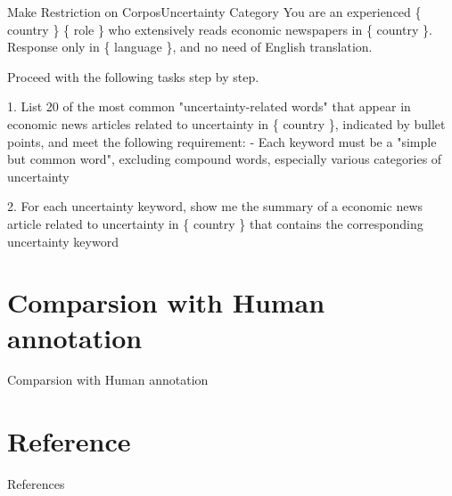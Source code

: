 \documentclass[11.5pt]{beamer}
\begin{document}
\begin{frame}{Make Restriction on Corpos}{Uncertainty Category}
You are an experienced \{ country \} \{ role \} who extensively reads economic
newspapers in \{ country \}. Response only in \{ language \}, and no
need of English translation. \newline

Proceed with the following tasks step by step. \newline

1. List 20 of the most common "uncertainty-related words" that appear in
    economic news articles related to uncertainty in \{ country \}, indicated
    by bullet points, and meet the following requirement: \newline
- Each keyword must be a "simple but common word", excluding compound words,
    especially various categories of uncertainty \newline

2. For each uncertainty keyword, show me the summary of a economic news
    article related to uncertainty in \{ country \} that contains the
    corresponding uncertainty keyword
\end{frame}


\section{Comparsion with Human annotation}


\begin{frame}{Comparsion with Human annotation}
\end{frame}


\section{Reference}


\begin{frame}{References}

\end{frame}
\end{document}
